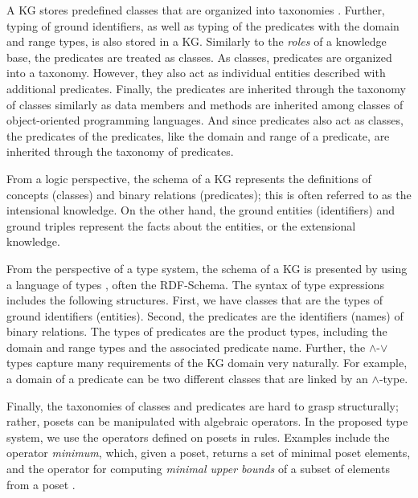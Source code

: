 \documentclass[runningheads]{llncs}
\begin{document}
A KG stores predefined classes that are organized into taxonomies
\cite{Baader2002}. Further, typing of ground identifiers, as well as
typing of the predicates with the domain and range types, is also
stored in a KG. Similarly to the \emph{roles} \cite{Brachman1985} of a
knowledge base, the predicates are treated as classes. As classes,
predicates are organized into a taxonomy. However, they also act as
individual entities described with additional predicates. Finally, the
predicates are inherited through the taxonomy of classes similarly as
data members and methods are inherited among classes of
object-oriented programming languages. And since predicates also act
as classes, the predicates of the predicates, like the domain and
range of a predicate, are inherited through the taxonomy of
predicates.

From a logic perspective, the schema of a KG represents the
definitions of concepts (classes) and binary relations (predicates);
this is often referred to as the intensional knowledge. On the other
hand, the ground entities (identifiers) and ground triples represent
the facts about the entities, or the extensional knowledge.

From the perspective of a type system, the schema of a KG is presented
by using a language of types \cite{Pierce2002}, often the
RDF-Schema. The syntax of type expressions includes the following
structures. First, we have classes that are the types of ground
identifiers (entities). Second, the predicates are the identifiers
(names) of binary relations. The types of predicates are the product
types, including the domain and range types and the associated
predicate name. Further, the $\land$-$\lor$ types \cite{Pierce1996}
capture many requirements of the KG domain very naturally. For
example, a domain of a predicate can be two different classes that are
linked by an $\land$-type.

Finally, the taxonomies of classes and predicates are hard to grasp
structurally; rather, posets can be manipulated with algebraic
operators. In the proposed type system, we use the operators defined
on posets in rules. Examples include the operator \emph{minimum},
which, given a poset, returns a set of minimal poset elements, and the
operator for computing \emph{minimal upper bounds} of a subset of
elements from a poset \cite{DaveyPriestley2002}.
\end{document}
